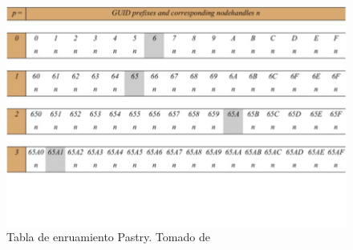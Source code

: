  

  
  	\begin{figure}%
  	\includegraphics {10/pastry-tab} 
  	\caption{Tabla de enruamiento Pastry. Tomado de \cite{Coulouris2011}}
  	\label{fig:pastry-te}
  \end{figure}
 
 

 